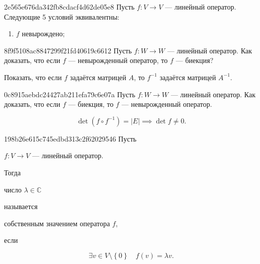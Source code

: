 \begin{note}{2e565e676da342fb8cdacf4d62de05e8}
    Пусть \( f : V \to V \) --- линейный оператор. Следующие 5 условий эквивалентны:
    \begin{enumerate}
        \item \( f \) невырождено;
    \end{enumerate}
\end{note}

\begin{note}{8f9f5108ac8847299f21fd40619c6612}
    Пусть \( f : W \to W \) --- линейный оператор. Как доказать, что если \( f \) --- невырожденный оператор, то \( f \) --- биекция?

    \begin{cloze}{1}
        Показать, что если \( f \) задаётся матрицей \( A \), то \( f^{-1} \) задаётся матрицей \( A^{-1} \).
    \end{cloze}
\end{note}

\begin{note}{0c8915aebdc24427ab211efa79c6e07a}
    Пусть \( f : W \to W \) --- линейный оператор. Как доказать, что если \( f \) --- биекция, то \( f \) --- невырожденный оператор.

    \begin{cloze}{1}
        \[
            \det (f \circ f^{-1}) = |E| \implies \det f \neq 0.
        \]
    \end{cloze}
\end{note}

\begin{note}{198b26e615c745edbd313c2f62029546}
    Пусть \begin{icloze}{3}\( f : V \to V \) --- линейный оператор.\end{icloze} Тогда \begin{icloze}{1}число \( \lambda \in \mathbb C  \)\end{icloze} называется \begin{icloze}{2}собственным значением оператора \( f \),\end{icloze} если
    \begin{icloze}{1}
        \[
            \exists v \in V \setminus \left\{ 0 \right\} \quad f(v) = \lambda v.
        \]
    \end{icloze}
\end{note}

